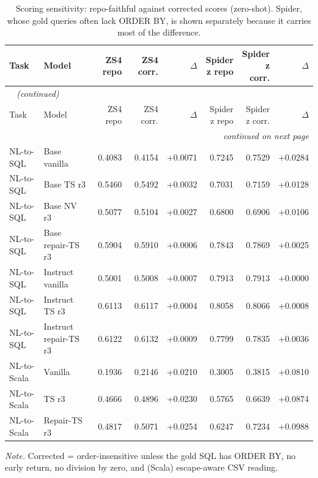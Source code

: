 {\small
{}
\setlength{\tabcolsep}{4.2pt}
\begin{longtable}{@{}llrrrrrr@{}}
\caption{Scoring sensitivity: repo-faithful against corrected scores (zero-shot). Spider, whose gold queries often lack ORDER BY, is shown separately because it carries most of the difference.}\label{tab:gen-scoring}\\
\toprule
\rowcolor{headshade}Task & Model & ZS4 repo & ZS4 corr. & $\Delta$ & \makecell{Spider\\z repo} & \makecell{Spider\\z corr.} & $\Delta$\\
\midrule
\endfirsthead
\multicolumn{8}{l}{\textit{\tablename~\thetable{} (continued)}}\\
\toprule
\rowcolor{headshade}Task & Model & ZS4 repo & ZS4 corr. & $\Delta$ & \makecell{Spider\\z repo} & \makecell{Spider\\z corr.} & $\Delta$\\
\midrule
\endhead
\midrule
\multicolumn{8}{r}{\textit{continued on next page}}\\
\endfoot
\bottomrule
\endlastfoot
NL-to-SQL & Base vanilla & 0.4083 & 0.4154 & +0.0071 & 0.7245 & 0.7529 & +0.0284\\
NL-to-SQL & Base TS r3 & 0.5460 & 0.5492 & +0.0032 & 0.7031 & 0.7159 & +0.0128\\
NL-to-SQL & Base NV r3 & 0.5077 & 0.5104 & +0.0027 & 0.6800 & 0.6906 & +0.0106\\
NL-to-SQL & Base repair-TS r3 & 0.5904 & 0.5910 & +0.0006 & 0.7843 & 0.7869 & +0.0025\\
NL-to-SQL & Instruct vanilla & 0.5001 & 0.5008 & +0.0007 & 0.7913 & 0.7913 & +0.0000\\
NL-to-SQL & Instruct TS r3 & 0.6113 & 0.6117 & +0.0004 & 0.8058 & 0.8066 & +0.0008\\
NL-to-SQL & Instruct repair-TS r3 & 0.6122 & 0.6132 & +0.0009 & 0.7799 & 0.7835 & +0.0036\\
NL-to-Scala & Vanilla & 0.1936 & 0.2146 & +0.0210 & 0.3005 & 0.3815 & +0.0810\\
NL-to-Scala & TS r3 & 0.4666 & 0.4896 & +0.0230 & 0.5765 & 0.6639 & +0.0874\\
NL-to-Scala & Repair-TS r3 & 0.4817 & 0.5071 & +0.0254 & 0.6247 & 0.7234 & +0.0988\\
\end{longtable}
}
\vspace{-0.6\baselineskip}
{\footnotesize\color{slate}\textit{Note.} Corrected = order-insensitive unless the gold SQL has ORDER BY, no early return, no division by zero, and (Scala) escape-aware CSV reading.\par}
\medskip
